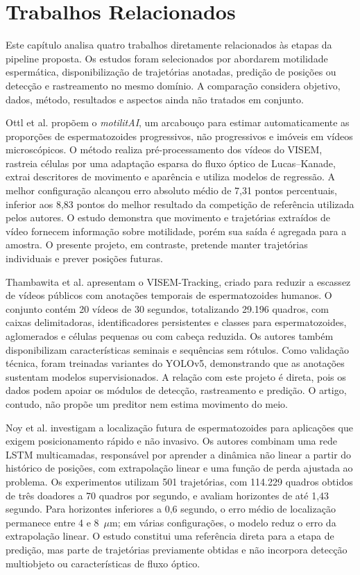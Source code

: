 \chapter[Trabalhos Relacionados]{Trabalhos Relacionados}

Este capítulo analisa quatro trabalhos diretamente relacionados às etapas da pipeline proposta. Os estudos foram selecionados por abordarem motilidade espermática, disponibilização de trajetórias anotadas, predição de posições ou detecção e rastreamento no mesmo domínio. A comparação considera objetivo, dados, método, resultados e aspectos ainda não tratados em conjunto.

Ottl et al. \cite{ottl2022motilitai} propõem o \textit{motilitAI}, um arcabouço para estimar automaticamente as proporções de espermatozoides progressivos, não progressivos e imóveis em vídeos microscópicos. O método realiza pré-processamento dos vídeos do VISEM, rastreia células por uma adaptação esparsa do fluxo óptico de Lucas--Kanade, extrai descritores de movimento e aparência e utiliza modelos de regressão. A melhor configuração alcançou erro absoluto médio de 7,31 pontos percentuais, inferior aos 8,83 pontos do melhor resultado da competição de referência utilizada pelos autores. O estudo demonstra que movimento e trajetórias extraídos de vídeo fornecem informação sobre motilidade, porém sua saída é agregada para a amostra. O presente projeto, em contraste, pretende manter trajetórias individuais e prever posições futuras.

Thambawita et al. \cite{thambawita2023visemtracking} apresentam o VISEM-Tracking, criado para reduzir a escassez de vídeos públicos com anotações temporais de espermatozoides humanos. O conjunto contém 20 vídeos de 30 segundos, totalizando 29.196 quadros, com caixas delimitadoras, identificadores persistentes e classes para espermatozoides, aglomerados e células pequenas ou com cabeça reduzida. Os autores também disponibilizam características seminais e sequências sem rótulos. Como validação técnica, foram treinadas variantes do YOLOv5, demonstrando que as anotações sustentam modelos supervisionados. A relação com este projeto é direta, pois os dados podem apoiar os módulos de detecção, rastreamento e predição. O artigo, contudo, não propõe um preditor nem estima movimento do meio.

Noy et al. \cite{noy2023location} investigam a localização futura de espermatozoides para aplicações que exigem posicionamento rápido e não invasivo. Os autores combinam uma rede LSTM multicamadas, responsável por aprender a dinâmica não linear a partir do histórico de posições, com extrapolação linear e uma função de perda ajustada ao problema. Os experimentos utilizam 501 trajetórias, com 114.229 quadros obtidos de três doadores a 70 quadros por segundo, e avaliam horizontes de até 1,43 segundo. Para horizontes inferiores a 0,6 segundo, o erro médio de localização permanece entre 4 e 8~$\mu$m; em várias configurações, o modelo reduz o erro da extrapolação linear. O estudo constitui uma referência direta para a etapa de predição, mas parte de trajetórias previamente obtidas e não incorpora detecção multiobjeto ou características de fluxo óptico.

